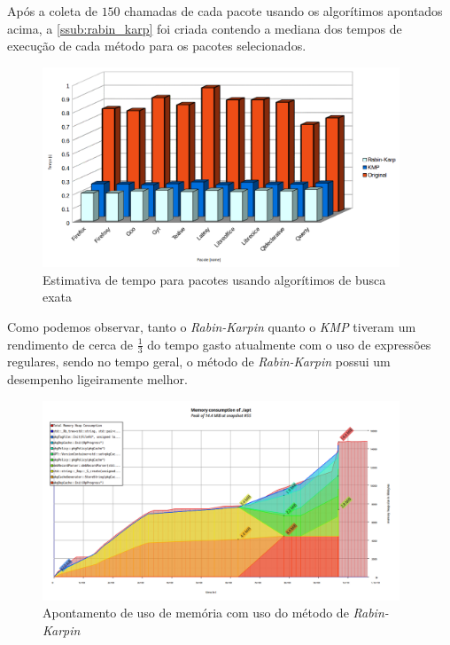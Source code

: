 Após a coleta de $150$ chamadas de cada pacote usando os algorítimos apontados acima, a \autoref{ssub:rabin_karp} foi criada contendo a mediana dos tempos de execução de cada método para os pacotes selecionados.

\begin{figure}[htbp]
  \centering
  \includegraphics[width=0.95\textwidth]{figuras/tempo-rk_kmp_std}
  \caption{Estimativa de tempo para pacotes usando algorítimos de busca exata}
  \label{tempo_rk_kmp_std}
\end{figure}

Como podemos observar, tanto o \textit{Rabin-Karpin} quanto o \textit{KMP} tiveram um rendimento de cerca de $\frac{1}{3}$ do tempo gasto atualmente com o uso de expressões regulares, sendo no tempo geral, o método de \textit{Rabin-Karpin} possui um desempenho ligeiramente melhor.


\begin{figure}[htbp]
  \centering
  \includegraphics[width=0.95\textwidth]{figuras/memory_rk.png}
  \caption{Apontamento de uso de memória com uso do método de \textit{Rabin-Karpin}}
  \label{memory_rk}
\end{figure}

